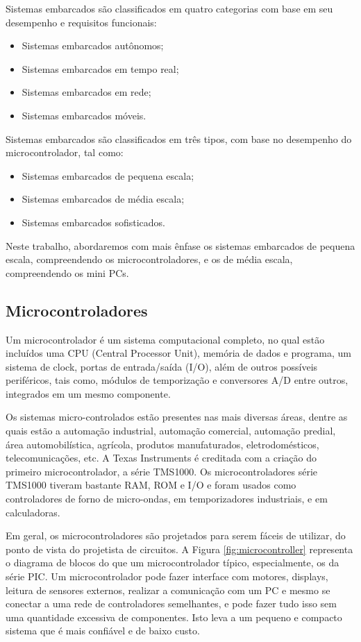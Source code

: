 Sistemas embarcados são classificados em quatro categorias com base
em seu desempenho e requisitos funcionais:
\begin{itemize}
\item Sistemas embarcados autônomos;
\item Sistemas embarcados em tempo real; 
\item Sistemas embarcados em rede; 
\item Sistemas embarcados móveis.
\end{itemize}
Sistemas embarcados são classificados em três tipos, com base no desempenho
do microcontrolador, tal como:
\begin{itemize}
\item Sistemas embarcados de pequena escala; 
\item Sistemas embarcados de média escala; 
\item Sistemas embarcados sofisticados.
\end{itemize}
Neste trabalho, abordaremos com mais ênfase os sistemas embarcados
de pequena escala, compreendendo os microcontroladores, e os de média
escala, compreendendo os mini PCs.

\subsection{Microcontroladores}

Um microcontrolador é um sistema computacional completo, no qual estão
incluídos uma CPU (Central Processor Unit), memória de dados e programa,
um sistema de clock, portas de entrada/saída (I/O), além de outros
possíveis periféricos, tais como, módulos de temporização e conversores
A/D entre outros, integrados em um mesmo componente\cite{Chou1992}.

Os sistemas micro-controlados estão presentes nas mais diversas áreas,
dentre as quais estão a automação industrial, automação comercial,
automação predial, área automobilística, agrícola, produtos manufaturados,
eletrodomésticos, telecomunicações, etc. A Texas Instruments é creditada
com a criação do primeiro microcontrolador, a série TMS1000. Os microcontroladores
série TMS1000 tiveram bastante RAM, ROM e I/O e foram usados como
controladores de forno de micro-ondas, em temporizadores industriais,
e em calculadoras\cite{Gadre2000}.

Em geral, os microcontroladores são projetados para serem fáceis de
utilizar, do ponto de vista do projetista de circuitos. A Figura \ref{fig:microcontroller}
representa o diagrama de blocos do que um microcontrolador típico,
especialmente, os da série PIC. Um microcontrolador pode fazer interface
com motores, displays, leitura de sensores externos, realizar a comunicação
com um PC e mesmo se conectar a uma rede de controladores semelhantes,
e pode fazer tudo isso sem uma quantidade excessiva de componentes.
Isto leva a um pequeno e compacto sistema que é mais confiável e de
baixo custo.

